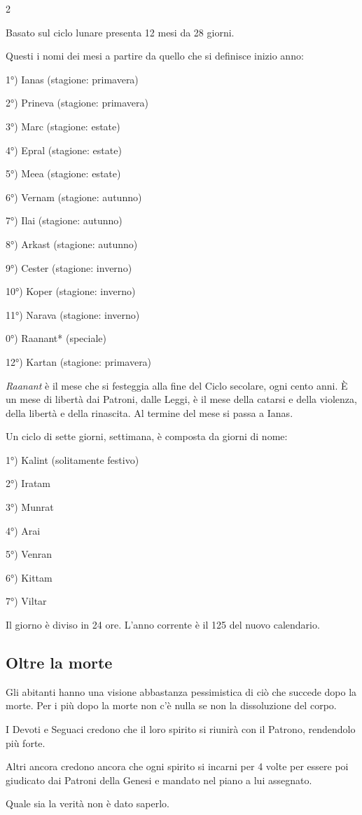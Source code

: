 \begin{multicols}{2}

\label{il-calendario}

Basato sul ciclo lunare presenta 12 mesi da 28 giorni.

Questi i nomi dei mesi a partire da quello che si definisce inizio anno:

1°) Ianas (stagione: primavera)

2°) Prineva (stagione: primavera)

3°) Marc (stagione: estate)

4°) Epral (stagione: estate)

5°) Meea (stagione: estate)

6°) Vernam (stagione: autunno)

7°) Ilai (stagione: autunno)

8°) Arkast (stagione: autunno)

9°) Cester (stagione: inverno)

10°) Koper (stagione: inverno)

11°) Narava (stagione: inverno)

0°) Raanant* (speciale)

12°) Kartan (stagione: primavera)

\medskip

\emph{Raanant} è il mese che si festeggia alla fine del Ciclo secolare, ogni cento anni. È un mese di libertà dai Patroni, dalle Leggi, è il mese della catarsi e della violenza, della libertà e della rinascita. Al termine del mese si passa a Ianas.

\medskip

Un ciclo di sette giorni, settimana, è composta da giorni di nome:

\medskip

1°) Kalint (solitamente festivo)

2°) Iratam

3°) Munrat

4°) Arai

5°) Venran

6°) Kittam

7°) Viltar

\medskip

Il giorno è diviso in 24 ore. L'anno corrente è il 125 del nuovo calendario.

\subsection{Oltre la morte}

Gli abitanti hanno una visione abbastanza pessimistica di ciò che succede dopo la morte. Per i più dopo la morte non c'è nulla se non la dissoluzione del corpo.

I Devoti e Seguaci credono che il loro spirito si riunirà con il Patrono, rendendolo più forte.

Altri ancora credono ancora che ogni spirito si incarni per 4 volte per essere poi giudicato dai Patroni della Genesi e mandato nel piano a lui assegnato.

Quale sia la verità non è dato saperlo.

\end{multicols}

